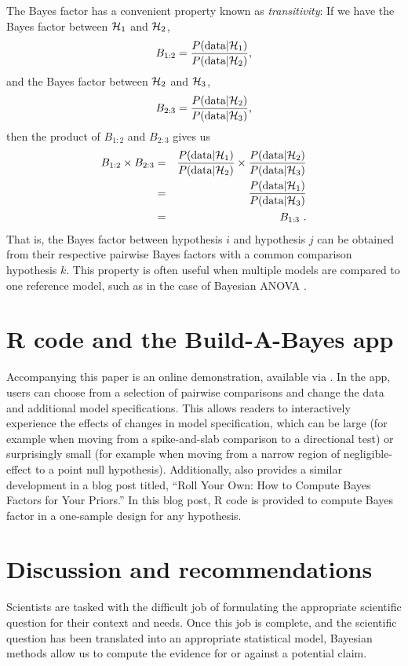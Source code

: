 \begin{tcolorbox}[title=Box~3: Transitivity of the Bayes factor,code={\singlespacing}]
The Bayes factor has a convenient property known as \textit{transitivity}:  If we have the Bayes factor between ${\mathcal{H}}_1$ and ${\mathcal{H}}_2$, $$B_{1:2}=\frac{P(\text{data}|{\mathcal{H}}_1)}{P(\text{data}|{\mathcal{H}}_2)},$$ and the Bayes factor between ${\mathcal{H}}_2$ and ${\mathcal{H}}_3$, $$B_{2:3}=\frac{P(\text{data}|{\mathcal{H}}_2)}{P(\text{data}|{\mathcal{H}}_3)},$$ then the product of $B_{1:2}$ and $B_{2:3}$ gives us 
\begin{eqnarray*}B_{1:2}\times B_{2:3}
&=& \frac{P(\text{data}|{\mathcal{H}}_1)}{P(\text{data}|{\mathcal{H}}_2)}\times\frac{P(\text{data}|{\mathcal{H}}_2)}{P(\text{data}|{\mathcal{H}}_3)}\\
&=& \frac{P(\text{data}|{\mathcal{H}}_1)}{P(\text{data}|{\mathcal{H}}_3)}\\ &=& B_{1:3}~.
\end{eqnarray*}
That is, the Bayes factor between hypothesis $i$ and hypothesis $j$ can be obtained from their respective pairwise Bayes factors with a common comparison hypothesis $k$. This property is often useful when multiple models are compared to one reference model, such as in the case of Bayesian ANOVA \cite{RouderEtAl2012ANOVA}.
\end{tcolorbox}

\section*{R code and the Build-A-Bayes app}

Accompanying this paper is an online demonstration, available via \osf. In the app, users can choose from a selection of pairwise comparisons and change the data and additional model specifications. This allows readers to interactively experience the effects of changes in model specification, which can be large (for example when moving from a spike-and-slab comparison to a directional test) or surprisingly small (for example when moving from a narrow region of negligible-effect to a point null hypothesis).  Additionally,  also provides a similar development in a blog post titled, ``Roll Your Own: How to Compute Bayes Factors for Your Priors.'' In this blog post, R code is provided to compute Bayes factor in a one-sample design for any hypothesis.

\section*{Discussion and recommendations}

Scientists are tasked with the difficult job of formulating the appropriate scientific question for their context and needs. Once this job is complete, and the scientific question has been translated into an appropriate statistical model, Bayesian methods allow us to compute the evidence for or against a potential claim.

